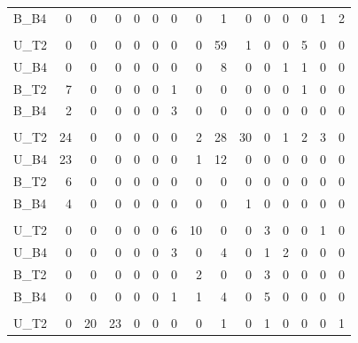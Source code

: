 \documentclass[
  11pt,
]{article}
\begin{document}
\begin{table}[!h]
{\begin{tabular}[t]{lrrrrrrrrrrrrrr}
\hspace{1em}B\_B4 & 0 & 0 & 0 & 0 & 0 & 0 & 0 & 1 & 0 & 0 & 0 & 0 & 1 & 2\\
\addlinespace[0.3em]
\multicolumn{15}{l}{\textit{\textbf{A. desertorum}}}\\
\hspace{1em}U\_T2 & 0 & 0 & 0 & 0 & 0 & 0 & 0 & 59 & 1 & 0 & 0 & 5 & 0 & 0\\
\hspace{1em}U\_B4 & 0 & 0 & 0 & 0 & 0 & 0 & 0 & 8 & 0 & 0 & 1 & 1 & 0 & 0\\
\hspace{1em}B\_T2 & 7 & 0 & 0 & 0 & 0 & 1 & 0 & 0 & 0 & 0 & 0 & 1 & 0 & 0\\
\hspace{1em}B\_B4 & 2 & 0 & 0 & 0 & 0 & 3 & 0 & 0 & 0 & 0 & 0 & 0 & 0 & 0\\
\addlinespace[0.3em]
\multicolumn{15}{l}{\textit{\textbf{C. testiculatum}}}\\
\hspace{1em}U\_T2 & 24 & 0 & 0 & 0 & 0 & 0 & 2 & 28 & 30 & 0 & 1 & 2 & 3 & 0\\
\hspace{1em}U\_B4 & 23 & 0 & 0 & 0 & 0 & 0 & 1 & 12 & 0 & 0 & 0 & 0 & 0 & 0\\
\hspace{1em}B\_T2 & 6 & 0 & 0 & 0 & 0 & 0 & 0 & 0 & 0 & 0 & 0 & 0 & 0 & 0\\
\hspace{1em}B\_B4 & 4 & 0 & 0 & 0 & 0 & 0 & 0 & 0 & 1 & 0 & 0 & 0 & 0 & 0\\
\addlinespace[0.3em]
\multicolumn{15}{l}{\textit{\textbf{C. parviflora}}}\\
\hspace{1em}U\_T2 & 0 & 0 & 0 & 0 & 0 & 6 & 10 & 0 & 0 & 3 & 0 & 0 & 1 & 0\\
\hspace{1em}U\_B4 & 0 & 0 & 0 & 0 & 0 & 3 & 0 & 4 & 0 & 1 & 2 & 0 & 0 & 0\\
\hspace{1em}B\_T2 & 0 & 0 & 0 & 0 & 0 & 0 & 2 & 0 & 0 & 3 & 0 & 0 & 0 & 0\\
\hspace{1em}B\_B4 & 0 & 0 & 0 & 0 & 0 & 1 & 1 & 4 & 0 & 5 & 0 & 0 & 0 & 0\\
\addlinespace[0.3em]
\multicolumn{15}{l}{\textit{\textbf{S. altissimum}}}\\
\hspace{1em}U\_T2 & 0 & 20 & 23 & 0 & 0 & 0 & 0 & 1 & 0 & 1 & 0 & 0 & 0 & 1\\

\end{tabular}}
\end{table}
\end{document}
